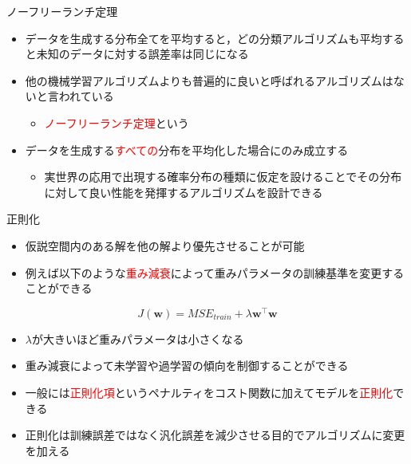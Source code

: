 \documentclass[dvipdfmx, 10pt]{beamer}
\begin{document}

\begin{frame}{ノーフリーランチ定理}
  \begin{itemize}
    \item データを生成する分布全てを平均すると，どの分類アルゴリズムも平均すると未知のデータに対する誤差率は同じになる
    \item 他の機械学習アルゴリズムよりも普遍的に良いと呼ばれるアルゴリズムはないと言われている
    \begin{itemize}
      \item \textcolor{red}{ノーフリーランチ定理}という
    \end{itemize}
    \item データを生成する\textcolor{red}{すべての}分布を平均化した場合にのみ成立する
    \begin{itemize}
      \item 実世界の応用で出現する確率分布の種類に仮定を設けることでその分布に対して良い性能を発揮するアルゴリズムを設計できる
    \end{itemize}
  \end{itemize}
\end{frame}


\begin{frame}{正則化}
  \begin{itemize}
    \item 仮説空間内のある解を他の解より優先させることが可能
    \item 例えば以下のような\textcolor{red}{重み減衰}によって重みパラメータの訓練基準を変更することができる
  \end{itemize}
  \begin{equation}
    J(\bm{w}) = MSE_{train} + \lambda \bm{w}^{\top} \bm{w}
  \end{equation}
  \begin{itemize}
    \item $\lambda$が大きいほど重みパラメータは小さくなる
    \item 重み減衰によって未学習や過学習の傾向を制御することができる
    \item 一般には\textcolor{red}{正則化項}というペナルティをコスト関数に加えてモデルを\textcolor{red}{正則化}できる
    \item 正則化は訓練誤差ではなく汎化誤差を減少させる目的でアルゴリズムに変更を加える
  \end{itemize}
\end{frame}
\end{document}
